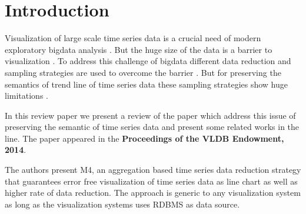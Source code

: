 \section{Introduction} \label{intro}
Visualization of large scale time series data is a crucial need of modern exploratory
bigdata analysis \cite{fu2011review}. But the huge size of the data is a barrier to visualization \cite{labrinidis2012challenges,fan2014challenges,chen2014data}. 
To address this challenge of bigdata different data reduction and sampling strategies are used to overcome the barrier \cite{cormode2014sampling,wu2014data}. But for preserving the 
semantics of trend line of time series data these sampling strategies show huge 
limitations \cite{jugel2014m4}. 

In this review paper we present a review of the paper \cite{jugel2014m4} which address this issue of preserving the semantic of time series data and present some related works in the line.  The paper appeared in the \textbf{Proceedings of the VLDB Endowment, 2014}. 

The authors present M4, an aggregation based time series data reduction strategy that guarantees error free visualization of time series data as line chart as well as higher rate of data reduction. The approach is generic to any visualization system as long as the visualization systems uses RDBMS as data source.  